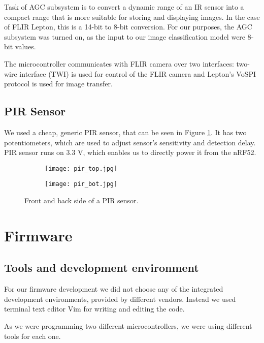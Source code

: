 Task of AGC subsystem is to convert a dynamic range of an IR sensor into a compact range that is more suitable for storing and displaying images.
In the case of FLIR Lepton, this is a 14-bit to 8-bit conversion.
For our purposes, the AGC subsystem was turned on, as the input to our image classification model were 8-bit values.

The microcontroller communicates with FLIR camera over two interfaces: two-wire interface (TWI) is used for control of the FLIR camera and Lepton's VoSPI protocol is used for image transfer.

\subsection{ PIR Sensor}

We used a cheap, generic PIR sensor, that can be seen in Figure \ref{pir_sensor}.
It has two potentiometers, which are used to adjust sensor's sensitivity and detection delay.
PIR sensor runs on 3.3 V, which enables us to directly power it from the nRF52. 

\begin{figure}[ht] 
    \begin{subfigure}[b]{0.5\textwidth}
        \centering
        \texttt{[image: pir\_top.jpg]} 
    \end{subfigure}
    \begin{subfigure}[b]{0.5\textwidth}
        \centering
        \texttt{[image: pir\_bot.jpg]} 
    \end{subfigure}
    \caption{ Front and back side of a PIR sensor.}
    \label{pir_sensor}
\end{figure}

\section{ Firmware}
\subsection{ Tools and development environment}

For our firmware development we did not choose any of the integrated development environments, provided by different vendors.
Instead we used terminal text editor Vim for writing and editing the code.

As we were programming two different microcontrollers, we were using different tools for each one.



